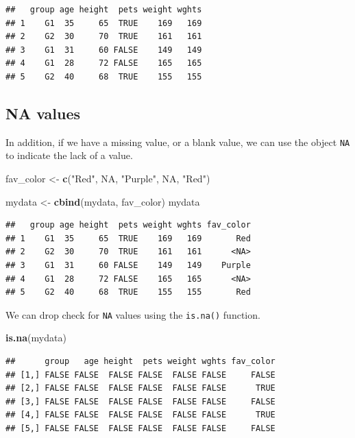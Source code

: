 \documentclass[
]{book}
\newenvironment{Shaded}{\begin{snugshade}}{\end{snugshade}}
\newcommand{\KeywordTok}[1]{\textcolor[rgb]{0.13,0.29,0.53}{\textbf{#1}}}
\newcommand{\NormalTok}[1]{#1}
\newcommand{\OtherTok}[1]{\textcolor[rgb]{0.56,0.35,0.01}{#1}}
\newcommand{\StringTok}[1]{\textcolor[rgb]{0.31,0.60,0.02}{#1}}
\begin{document}
\begin{verbatim}
##   group age height  pets weight wghts
## 1    G1  35     65  TRUE    169   169
## 2    G2  30     70  TRUE    161   161
## 3    G1  31     60 FALSE    149   149
## 4    G1  28     72 FALSE    165   165
## 5    G2  40     68  TRUE    155   155
\end{verbatim}

\hypertarget{na-values}{%
\subsection*{NA values}\label{na-values}}

In addition, if we have a missing value, or a blank value, we can use the object \texttt{NA} to indicate the lack of a value.

\begin{Shaded}
\begin{Highlighting}[]
\NormalTok{fav_color <-}\StringTok{ }\KeywordTok{c}\NormalTok{(}\StringTok{"Red"}\NormalTok{,}
    \OtherTok{NA}\NormalTok{, }\StringTok{"Purple"}\NormalTok{, }\OtherTok{NA}\NormalTok{,}
    \StringTok{"Red"}\NormalTok{)}

\NormalTok{mydata <-}\StringTok{ }\KeywordTok{cbind}\NormalTok{(mydata,}
\NormalTok{    fav_color)}
\NormalTok{mydata}
\end{Highlighting}
\end{Shaded}

\begin{verbatim}
##   group age height  pets weight wghts fav_color
## 1    G1  35     65  TRUE    169   169       Red
## 2    G2  30     70  TRUE    161   161      <NA>
## 3    G1  31     60 FALSE    149   149    Purple
## 4    G1  28     72 FALSE    165   165      <NA>
## 5    G2  40     68  TRUE    155   155       Red
\end{verbatim}

We can drop check for \texttt{NA} values using the \texttt{is.na()} function.

\begin{Shaded}
\begin{Highlighting}[]
\KeywordTok{is.na}\NormalTok{(mydata)}
\end{Highlighting}
\end{Shaded}

\begin{verbatim}
##      group   age height  pets weight wghts fav_color
## [1,] FALSE FALSE  FALSE FALSE  FALSE FALSE     FALSE
## [2,] FALSE FALSE  FALSE FALSE  FALSE FALSE      TRUE
## [3,] FALSE FALSE  FALSE FALSE  FALSE FALSE     FALSE
## [4,] FALSE FALSE  FALSE FALSE  FALSE FALSE      TRUE
## [5,] FALSE FALSE  FALSE FALSE  FALSE FALSE     FALSE
\end{verbatim}
\end{document}
